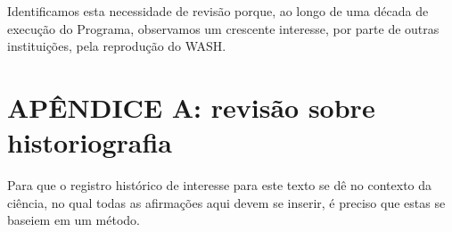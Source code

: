 Identificamos esta necessidade de revisão porque, ao longo de uma década de execução do Programa, observamos um crescente interesse, por parte de outras instituições, pela reprodução do WASH.

\chapter[REFERÊNCIAS]{}\label{REFERÊNCIAS}

\begin{minipage}{\textwidth}

\end{minipage}

\newpage

\begin{minipage}{\textwidth}

\end{minipage}

\newpage

\begin{minipage}{\textwidth}

\end{minipage}

\newpage

\begin{minipage}{\textwidth}

\end{minipage}

\newpage

\begin{minipage}{\textwidth}

\end{minipage}

\newpage

\begin{minipage}{\textwidth}

\end{minipage}

\newpage

\begin{minipage}{\textwidth}

\end{minipage}

\newpage

\begin{minipage}{\textwidth}

\end{minipage}



\chapter[APÊNDICE A: revisão sobre historiografia]{APÊNDICE A: revisão sobre historiografia}\label{APÊNDICE A: revisão sobre historiografia}
Para que o registro histórico de interesse para este texto se dê no contexto da ciência, no qual todas as afirmações aqui devem se inserir, é preciso que estas se baseiem em um método.

